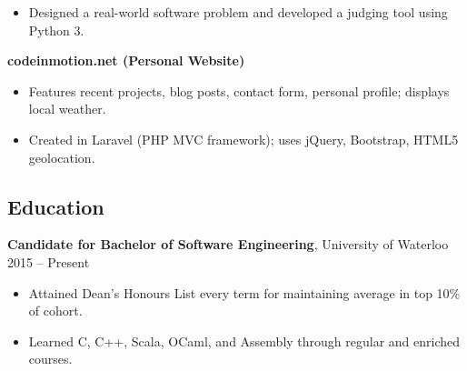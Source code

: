 \documentclass[]{article}
\begin{document}
\begin{itemize}
\item
  Designed a real-world software problem and developed a judging tool
  using Python 3.
\end{itemize}

\textbf{codeinmotion.net (Personal Website)}

\begin{itemize}
\item
  Features recent projects, blog posts, contact form, personal profile;
  displays local weather.
\item
  Created in Laravel (PHP MVC framework); uses jQuery, Bootstrap, HTML5
  geolocation.
\end{itemize}

\subsection{Education}

\textbf{Candidate for Bachelor of Software Engineering}, University of
Waterloo 2015 -- Present

\begin{itemize}
\item
  Attained Dean's Honours List every term for maintaining average in top
  10\% of cohort.
\item
  Learned C, C++, Scala, OCaml, and Assembly through regular and
  enriched courses.
\end{itemize}
\end{document}
